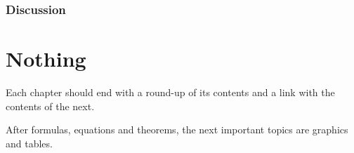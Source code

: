 \subsubsection{Discussion}
%
\section{Nothing}
Each chapter should end with a round-up of its contents and a link
with the contents of the next.
\par
After formulas, equations and theorems, the next important
topics are graphics and tables.
